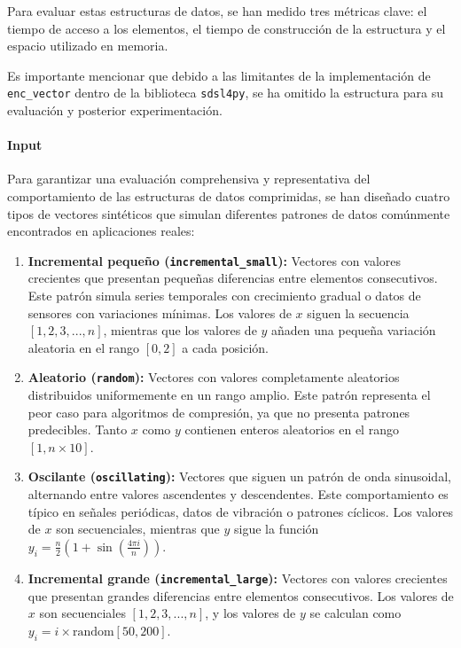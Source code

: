 Para evaluar estas estructuras de datos, se han medido tres métricas clave: el tiempo de acceso a los elementos, el tiempo de construcción de la estructura y el espacio utilizado en memoria. 

Es importante mencionar que debido a las limitantes de la implementación de \texttt{enc\_vector} dentro de la biblioteca \texttt{sdsl4py}, se ha omitido la estructura para su evaluación y posterior experimentación. 

\paragraph{Input}
\vspace{0.2cm}

Para garantizar una evaluación comprehensiva y representativa del comportamiento de las estructuras de datos comprimidas, se han diseñado cuatro tipos de vectores sintéticos que simulan diferentes patrones de datos comúnmente encontrados en aplicaciones reales:

\begin{enumerate}
    \item \textbf{Incremental pequeño (\texttt{incremental\_small}):} Vectores con valores crecientes que presentan pequeñas diferencias entre elementos consecutivos. Este patrón simula series temporales con crecimiento gradual o datos de sensores con variaciones mínimas. Los valores de $x$ siguen la secuencia $[1, 2, 3, ..., n]$, mientras que los valores de $y$ añaden una pequeña variación aleatoria en el rango $[0, 2]$ a cada posición.

    \item \textbf{Aleatorio (\texttt{random}):} Vectores con valores completamente aleatorios distribuidos uniformemente en un rango amplio. Este patrón representa el peor caso para algoritmos de compresión, ya que no presenta patrones predecibles. Tanto $x$ como $y$ contienen enteros aleatorios en el rango $[1, n \times 10]$.

    \item \textbf{Oscilante (\texttt{oscillating}):} Vectores que siguen un patrón de onda sinusoidal, alternando entre valores ascendentes y descendentes. Este comportamiento es típico en señales periódicas, datos de vibración o patrones cíclicos. Los valores de $x$ son secuenciales, mientras que $y$ sigue la función $y_i = \frac{n}{2}(1 + \sin(\frac{4\pi i}{n}))$.

    \item \textbf{Incremental grande (\texttt{incremental\_large}):} Vectores con valores crecientes que presentan grandes diferencias entre elementos consecutivos. Los valores de $x$ son secuenciales $[1, 2, 3, ..., n]$, y los valores de $y$ se calculan como $y_i = i \times \text{random}[50, 200]$.
\end{enumerate}

